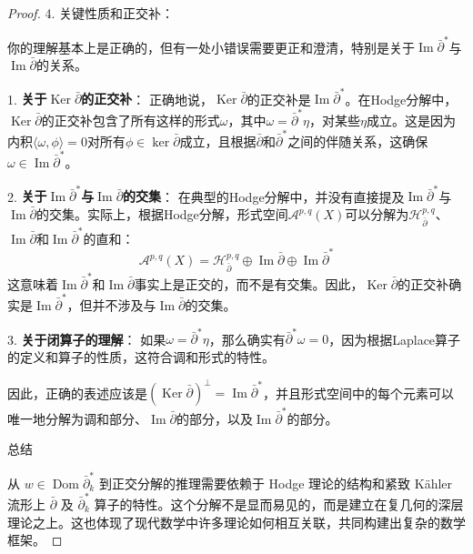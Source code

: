 \documentclass[lang=cn,zihao=-4,a4paper,fontset=none]{beautybook}
\begin{document}
\begin{proof}
4. 关键性质和正交补：

你的理解基本上是正确的，但有一处小错误需要更正和澄清，特别是关于$\operatorname{Im} \bar{\partial}^*$与$\operatorname{Im} \bar{\partial}$的关系。

1. \textbf{关于$\operatorname{Ker} \bar{\partial}$的正交补}：
正确地说，$\operatorname{Ker} \bar{\partial}$的正交补是$\operatorname{Im} \bar{\partial}^*$。在Hodge分解中，$\operatorname{Ker} \bar{\partial}$的正交补包含了所有这样的形式$\omega$，其中$\omega = \bar{\partial}^* \eta$，对某些$\eta$成立。这是因为内积$\langle \omega, \phi \rangle = 0$对所有$\phi \in \ker \bar{\partial}$成立，且根据$\bar{\partial}$和$\bar{\partial}^*$之间的伴随关系，这确保$\omega \in \operatorname{Im} \bar{\partial}^*$。

2. \textbf{关于$\operatorname{Im} \bar{\partial}^*$与$\operatorname{Im} \bar{\partial}$的交集}：
在典型的Hodge分解中，并没有直接提及$\operatorname{Im} \bar{\partial}^*$与$\operatorname{Im} \bar{\partial}$的交集。实际上，根据Hodge分解，形式空间$\mathcal{A}^{p,q}(X)$可以分解为$\mathcal{H}_{\bar{\partial}}^{p,q}$、$\operatorname{Im} \bar{\partial}$和$\operatorname{Im} \bar{\partial}^*$的直和：
     $$
     \mathcal{A}^{p,q}(X) = \mathcal{H}_{\bar{\partial}}^{p,q} \oplus \operatorname{Im} \bar{\partial} \oplus \operatorname{Im} \bar{\partial}^*
     $$
   这意味着$\operatorname{Im} \bar{\partial}^*$和$\operatorname{Im} \bar{\partial}$事实上是正交的，而不是有交集。因此，$\operatorname{Ker} \bar{\partial}$的正交补确实是$\operatorname{Im} \bar{\partial}^*$，但并不涉及与$\operatorname{Im} \bar{\partial}$的交集。

3. \textbf{关于闭算子的理解}：
如果$\omega = \bar{\partial}^* \eta$，那么确实有$\bar{\partial}^* \omega = 0$，因为根据Laplace算子的定义和算子的性质，这符合调和形式的特性。

因此，正确的表述应该是$(\operatorname{Ker} \bar{\partial})^\perp = \operatorname{Im} \bar{\partial}^*$，并且形式空间中的每个元素可以唯一地分解为调和部分、$\operatorname{Im} \bar{\partial}$的部分，以及$\operatorname{Im} \bar{\partial}^*$的部分。

总结

从 $w \in \operatorname{Dom} \bar{\partial}_k^*$ 到正交分解的推理需要依赖于 Hodge 理论的结构和紧致 Kähler 流形上 $\bar{\partial}$ 及 $\bar{\partial}_k^*$ 算子的特性。这个分解不是显而易见的，而是建立在复几何的深层理论之上。这也体现了现代数学中许多理论如何相互关联，共同构建出复杂的数学框架。
\end{proof}
    
\end{document}
